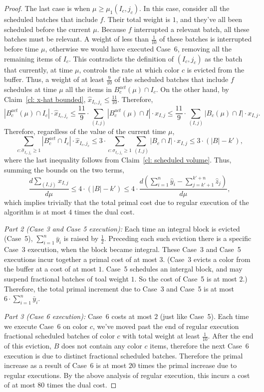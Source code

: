 \documentclass[12pt]{article}
\begin{document}
\begin{proof}
The last case is when $\mu\ge\mu_1(I_c,j_c)$. In this
case, consider all the scheduled batches that include $f$.
Their total weight is $1$, and they've all been scheduled
before the current $\mu$. Because $f$ interrupted a
relevant batch, all these batches must be relevant. A weight
of less than $\frac{1}{10}$ of these batches is interrupted
before time $\mu$, otherwise we would have executed
Case~6, removing all the remaining items of $I_c$. This 
contradicts the definition of $(I_c,j_c)$ as the batch that 
currently, at time $\mu$, controls the rate at which color
$c$ is evicted from the buffer. Thus, a weight of at least $\frac{9}{10}$
of the scheduled batches that include $f$ schedules at time 
$\mu$ all the items in $B_c^{act}(\mu)\cap I_c$. On the other 
hand, by Claim~\ref{cl: x-hat bounded}, 
$\hat{x}_{I_c,j_c}\le\frac{11}{10}$. Therefore,
$$
|B_c^{act}(\mu)\cap I_c|\cdot \hat{x}_{I_c,j_c}\le
\frac{11}{9}\cdot\sum_{(I,j)} |B_c^{act}(\mu)\cap I|\cdot x_{I,j}
\le \frac{11}{9}\cdot\sum_{(I,j)} |B_c(\mu)\cap I|\cdot x_{I,j}.
$$
Therefore, regardless of the value of the current time $\mu$,
$$
\sum_{c: \hat{\sigma}_{I_c,j_c}\ge 1} |B_c^{act}\cap I_c|\cdot \hat{x}_{I_c,j_c} \le
3\cdot\sum_{c: \hat{\sigma}_{I_c,j_c}\ge 1}\sum_{(I,j)} |B_c\cap I| \cdot x_{I,j}
\le 3\cdot (|B| - k'),
$$
where the last inequality follows from Claim~\ref{cl: scheduled volume}.
Thus, summing the bounds on the two terms,
$$
\frac{d\sum_{(I,j)} x_{I,j}}{d\mu}\le 4\cdot (|B| - k')\le 4\cdot
\frac{d\left(\sum_{i=1}^{n} \hat{y}_i 
- \sum_{j=k'+1}^{k'+n} \hat{z}_j\right)}{d\mu},
$$
which implies trivially that the total primal cost due to 
regular execution of the algorithm is at most $4$ times 
the dual cost.

{\em Part 2 (Case 3 and Case 5 execution):}\/
Each time an integral block is evicted (Case~5),
$\sum_{i=1}^{n} \bar{y}_i$ is raised by $\frac{1}{2}$.
Preceding each such eviction there is a specific Case~3 execution, 
 when the block became integral. 
These Case~3 and Case~5 executions incur together
a primal cost of at most $3$. (Case~3 evicts a color from
the buffer at a cost of at most $1$. Case~5 schedules an
intergal block, and may suspend fractional batches of
toal weight $1$. So the cost of Case~5 is at most $2$.)
Therefore, the total primal increment due
to Case~3 and Case~5 is at most $6\cdot\sum_{i=1}^{n} \bar{y}_i$.

{\em Part 3 (Case 6 execution):}\/ Case~6 costs at most $2$ (just like
Case~5). Each time we execute Case~6 on color $c$, we've moved past
the end of regular execution fractional scheduled batches of color $c$ with
total weight at least $\frac {1} {10}$. After the end of this eviction,
$B$ does not contain any color $c$ items, therefore the next Case~6
execution is due to distinct fractional scheduled batches.
Therefore the primal increase as a result of Case~6 is at most
$20$ times the primal increase due to regular executions.
By the above analysis of regular execution, this incurs a cost of 
at most $80$ times the dual cost.
\end{proof}
\end{document}
